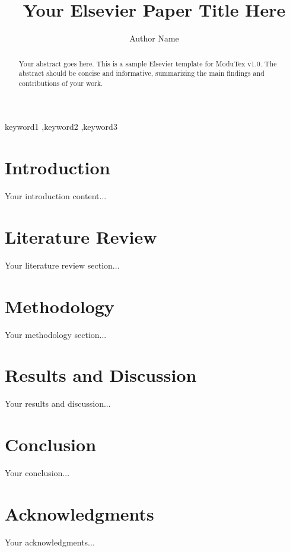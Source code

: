 \documentclass{elsarticle}
\title{Your Elsevier Paper Title Here}
\author{Author Name\corref{cor1}}
\begin{document}
\begin{frontmatter}

\maketitle

\begin{abstract}
Your abstract goes here. This is a sample Elsevier template for ModuTex v1.0. 
The abstract should be concise and informative, summarizing the main findings 
and contributions of your work.
\end{abstract}

\begin{keywords}
keyword1 \sep keyword2 \sep keyword3
\end{keywords}

\end{frontmatter}

\section{Introduction}
\label{sec:introduction}
Your introduction content...

\section{Literature Review}
\label{sec:literature}
Your literature review section...

\section{Methodology}
\label{sec:methodology}
Your methodology section...

\section{Results and Discussion}
\label{sec:results}
Your results and discussion...

\section{Conclusion}
\label{sec:conclusion}
Your conclusion...

\section*{Acknowledgments}
Your acknowledgments...



\end{document}
